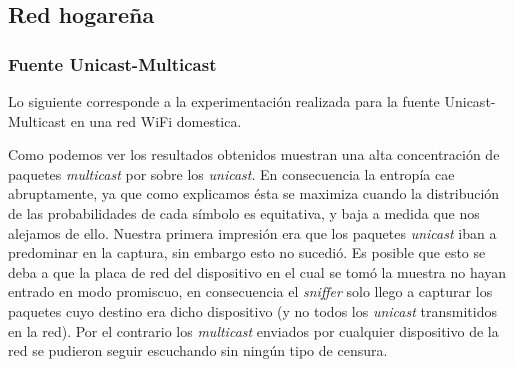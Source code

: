 \subsection{Red hogareña}

\subsubsection{Fuente Unicast-Multicast}

 Lo siguiente corresponde a la experimentación realizada para la fuente Unicast-Multicast en una red WiFi domestica.

\begin{figure}
	\begin{minipage}[b]{0.9\linewidth}
	\end{minipage}
\end{figure}

Como podemos ver los resultados obtenidos muestran una alta concentración de
paquetes \textit{multicast} por sobre los \textit{unicast}. En consecuencia la
entropía cae abruptamente, ya que como explicamos ésta se maximiza cuando la
distribución de las probabilidades de cada símbolo es equitativa, y baja a
medida que nos alejamos de ello. Nuestra primera impresión era que los
paquetes \textit{unicast} iban a predominar en la captura, sin embargo esto no
sucedió. Es posible que esto se deba a que la placa de red del dispositivo en
el cual se tomó la muestra no hayan entrado en modo promiscuo, en consecuencia
el \textit{sniffer} solo llego a capturar los paquetes cuyo destino era dicho
dispositivo (y no todos los \textit{unicast} transmitidos en la red). Por el
contrario los \textit{multicast} enviados por cualquier dispositivo de la red
se pudieron seguir escuchando sin ningún tipo de censura.


